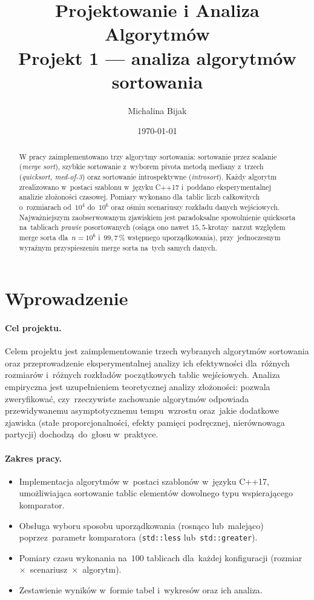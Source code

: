 \documentclass[11pt,a4paper]{article}
\title{Projektowanie i Analiza Algorytmów\\Projekt 1 — analiza algorytmów sortowania}
\author{Michalina Bijak}
\date{\today}
\begin{document}
\maketitle

\begin{abstract}
W pracy zaimplementowano trzy algorytmy sortowania: sortowanie przez scalanie (\emph{merge sort}),
szybkie sortowanie z~wyborem pivota metodą mediany z~trzech (\emph{quicksort, med-of-3}) oraz
sortowanie introspektywne (\emph{introsort}). Każdy algorytm zrealizowano w~postaci szablonu w~języku
C++17 i~poddano eksperymentalnej analizie złożoności czasowej. Pomiary wykonano dla~tablic liczb
całkowitych o~rozmiarach od~$10^4$ do~$10^6$ oraz ośmiu scenariuszy rozkładu danych wejściowych.
Najważniejszym zaobserwowanym zjawiskiem jest paradoksalne spowolnienie quicksorta na~tablicach
\emph{prawie} posortowanych (osiąga ono nawet $15{,}5$-krotny~narzut względem merge sorta dla~$n=10^6$
i~$99{,}7\,\%$ wstępnego uporządkowania), przy~jednoczesnym wyraźnym przyspieszeniu merge sorta
na~tych samych danych.
\end{abstract}

\tableofcontents

\section{Wprowadzenie}

\paragraph{Cel projektu.}
Celem projektu jest zaimplementowanie trzech wybranych algorytmów sortowania oraz przeprowadzenie
eksperymentalnej analizy ich efektywności dla~różnych rozmiarów i~różnych rozkładów początkowych
tablic wejściowych. Analiza empiryczna jest uzupełnieniem teoretycznej analizy złożoności: pozwala
zweryfikować, czy~rzeczywiste zachowanie algorytmów odpowiada przewidywanemu asymptotycznemu
tempu~wzrostu oraz~jakie dodatkowe zjawiska (stałe proporcjonalności, efekty pamięci podręcznej,
nierównowaga partycji) dochodzą~do~głosu w~praktyce.

\paragraph{Zakres pracy.}
\begin{itemize}[nosep]
  \item Implementacja algorytmów w~postaci szablonów w~języku C++17, umożliwiająca sortowanie
  tablic elementów dowolnego typu wspierającego komparator.
  \item Obsługa wyboru sposobu uporządkowania (rosnąco lub~malejąco) poprzez~parametr komparatora
  (\texttt{std::less} lub~\texttt{std::greater}).
  \item Pomiary czasu wykonania na~$100$ tablicach dla~każdej konfiguracji
  (rozmiar~$\times$~scenariusz~$\times$~algorytm).
  \item Zestawienie wyników w~formie tabel i~wykresów oraz ich analiza.
\end{itemize}
\end{document}
